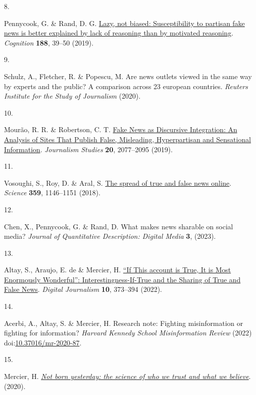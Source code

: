\documentclass[
  man]{apa6}
\newlength{\cslhangindent}
\newlength{\csllabelwidth}
\newenvironment{CSLReferences}[2] %
 {\begin{list}{}{%
  \setlength{\itemindent}{0pt}
  \setlength{\leftmargin}{0pt}
  \setlength{\parsep}{0pt}
  \ifodd #1
   \setlength{\leftmargin}{\cslhangindent}
   \setlength{\itemindent}{-1\cslhangindent}
  \fi
  \setlength{\itemsep}{#2\baselineskip}}}
 {\end{list}}
\newcommand{\CSLLeftMargin}[1]{\parbox[t]{\csllabelwidth}{\strut#1\strut}}
\newcommand{\CSLRightInline}[1]{\parbox[t]{\linewidth - \csllabelwidth}{\strut#1\strut}}
\begin{document}
\begin{CSLReferences}{0}{0}
\CSLLeftMargin{8. }%
\CSLRightInline{*Pennycook, G. \& Rand, D. G. \href{https://doi.org/10.1016/j.cognition.2018.06.011}{Lazy, not biased: Susceptibility to partisan fake news is better explained by lack of reasoning than by motivated reasoning}. \emph{Cognition} \textbf{188}, 39--50 (2019).}

\CSLLeftMargin{9. }%
\CSLRightInline{Schulz, A., Fletcher, R. \& Popescu, M. Are news outlets viewed in the same way by experts and the public? A comparison across 23 european countries. \emph{Reuters Institute for the Study of Journalism} (2020).}

\CSLLeftMargin{10. }%
\CSLRightInline{Mourão, R. R. \& Robertson, C. T. \href{https://doi.org/10.1080/1461670X.2019.1566871}{Fake News as Discursive Integration: An Analysis of Sites That Publish False, Misleading, Hyperpartisan and Sensational Information}. \emph{Journalism Studies} \textbf{20}, 2077--2095 (2019).}

\CSLLeftMargin{11. }%
\CSLRightInline{Vosoughi, S., Roy, D. \& Aral, S. \href{https://doi.org/10.1126/science.aap9559}{The spread of true and false news online}. \emph{Science} \textbf{359}, 1146--1151 (2018).}

\CSLLeftMargin{12. }%
\CSLRightInline{*Chen, X., Pennycook, G. \& Rand, D. What makes news sharable on social media? \emph{Journal of Quantitative Description: Digital Media} \textbf{3}, (2023).}

\CSLLeftMargin{13. }%
\CSLRightInline{*Altay, S., Araujo, E. de \& Mercier, H. \href{https://doi.org/10.1080/21670811.2021.1941163}{{``}If This account is True, It is Most Enormously Wonderful{''}: Interestingness-If-True and the Sharing of True and False News}. \emph{Digital Journalism} \textbf{10}, 373--394 (2022).}

\CSLLeftMargin{14. }%
\CSLRightInline{Acerbi, A., Altay, S. \& Mercier, H. Research note: Fighting misinformation or fighting for information? \emph{Harvard Kennedy School Misinformation Review} (2022) doi:\href{https://doi.org/10.37016/mr-2020-87}{10.37016/mr-2020-87}.}

\CSLLeftMargin{15. }%
\CSLRightInline{Mercier, H. \emph{\href{https://doi.org/10.1515/9780691198842}{Not born yesterday: the science of who we trust and what we believe}}. (2020).}


\end{CSLReferences}
\end{document}
